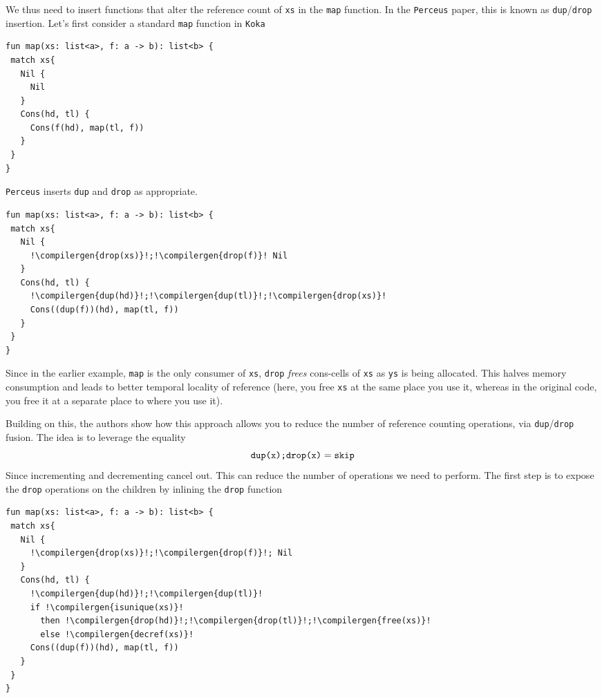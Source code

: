 We thus need to insert functions that alter the reference count of \texttt{xs} in the \texttt{map} function. In the \texttt{Perceus} paper, this is known as \texttt{dup}/\texttt{drop} insertion. Let's first consider a standard \texttt{map} function in \texttt{Koka}

\begin{code}
\label{code:koka-map}
\begin{verbatim}
fun map(xs: list<a>, f: a -> b): list<b> {
 match xs{
   Nil {
     Nil
   }
   Cons(hd, tl) {
     Cons(f(hd), map(tl, f))
   }
 }
}
\end{verbatim}
\end{code}

\texttt{Perceus} inserts \texttt{dup} and \texttt{drop} as appropriate.

\begin{code}
\label{code:koka-map-drop-dup-insertion}
\begin{verbatim}
fun map(xs: list<a>, f: a -> b): list<b> {
 match xs{
   Nil {
     !\compilergen{drop(xs)}!;!\compilergen{drop(f)}! Nil
   }
   Cons(hd, tl) {
     !\compilergen{dup(hd)}!;!\compilergen{dup(tl)}!;!\compilergen{drop(xs)}!
     Cons((dup(f))(hd), map(tl, f))
   }
 }
}
\end{verbatim}
\end{code}

Since in the earlier example, \texttt{map} is the only consumer of \texttt{xs}, \texttt{drop} \textit{frees} cons-cells of \texttt{xs} as \texttt{ys} is being allocated. This halves memory consumption and leads to better temporal locality of reference (here, you free \texttt{xs} at the same place you use it, whereas in the original code, you free it at a separate place to where you use it). 

Building on this, the authors show how this approach allows you to reduce the number of reference counting operations, via \texttt{dup}/\texttt{drop} fusion. The idea is to leverage the equality
\[\texttt{dup(x);\texttt{drop(x)}} = \texttt{skip}\]
Since incrementing and decrementing cancel out. This can reduce the number of operations we need to perform. The first step is to expose the \texttt{drop} operations on the children by inlining the \texttt{drop} function

\begin{code}
\label{code:koka-inline-drop}
\begin{verbatim}
fun map(xs: list<a>, f: a -> b): list<b> {
 match xs{
   Nil {
     !\compilergen{drop(xs)}!;!\compilergen{drop(f)}!; Nil
   }
   Cons(hd, tl) {
     !\compilergen{dup(hd)}!;!\compilergen{dup(tl)}!
     if !\compilergen{isunique(xs)}! 
       then !\compilergen{drop(hd)}!;!\compilergen{drop(tl)}!;!\compilergen{free(xs)}!
       else !\compilergen{decref(xs)}!
     Cons((dup(f))(hd), map(tl, f))
   }
 }
}
\end{verbatim}
\end{code}

